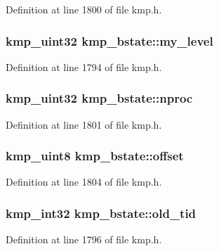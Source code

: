 Definition at line 1800 of file kmp.\-h.

\hypertarget{structkmp__bstate_a5e230863e70f4a123e9f199cbab279dc}{
\subsubsection[{my\-\_\-level}]{\setlength{\rightskip}{0pt plus 5cm}kmp\-\_\-uint32 kmp\-\_\-bstate\-::my\-\_\-level}}\label{structkmp__bstate_a5e230863e70f4a123e9f199cbab279dc}


Definition at line 1794 of file kmp.\-h.

\hypertarget{structkmp__bstate_a4f6dcc9e0b14e7c62f6b90bac37875b2}{
\subsubsection[{nproc}]{\setlength{\rightskip}{0pt plus 5cm}kmp\-\_\-uint32 kmp\-\_\-bstate\-::nproc}}\label{structkmp__bstate_a4f6dcc9e0b14e7c62f6b90bac37875b2}


Definition at line 1801 of file kmp.\-h.

\hypertarget{structkmp__bstate_a6b2ff7524147c480ec05972267ddb874}{
\subsubsection[{offset}]{\setlength{\rightskip}{0pt plus 5cm}kmp\-\_\-uint8 kmp\-\_\-bstate\-::offset}}\label{structkmp__bstate_a6b2ff7524147c480ec05972267ddb874}


Definition at line 1804 of file kmp.\-h.

\hypertarget{structkmp__bstate_a197984e81d9c2a932289380e558c6ee7}{
\subsubsection[{old\-\_\-tid}]{\setlength{\rightskip}{0pt plus 5cm}kmp\-\_\-int32 kmp\-\_\-bstate\-::old\-\_\-tid}}\label{structkmp__bstate_a197984e81d9c2a932289380e558c6ee7}


Definition at line 1796 of file kmp.\-h.

